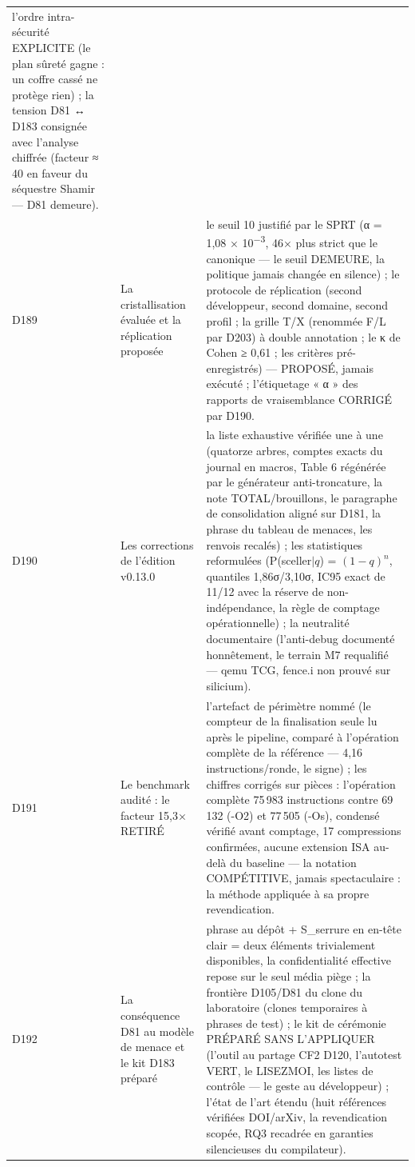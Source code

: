 \begin{longtable}{@{}p{1.6cm} p{4.6cm} >{\raggedright\arraybackslash}p{9.5cm}@{}}
l'ordre intra-sécurité EXPLICITE (le plan sûreté gagne : un coffre cassé
ne protège rien) ; la tension D81 ↔ D183 consignée avec l'analyse
chiffrée (facteur ≈ 40 en faveur du séquestre Shamir — D81 demeure). \\
D189 & La cristallisation évaluée et la réplication proposée & le seuil
10 justifié par le SPRT (α = 1,08 × 10\textsuperscript{−3}, 46× plus
strict que le canonique — le seuil DEMEURE, la politique jamais changée
en silence) ; le protocole de réplication (second développeur, second
domaine, second profil ; la grille T/X (renommée F/L par D203) à
double annotation ; le κ de
Cohen ≥ 0,61 ; les critères pré-enregistrés) — PROPOSÉ, jamais exécuté ;
l'étiquetage « α » des rapports de vraisemblance CORRIGÉ par D190. \\
D190 & Les corrections de l'édition v0.13.0 & la liste exhaustive vérifiée une à une (quatorze arbres, comptes exacts du journal en macros, Table 6 régénérée par le générateur anti-troncature, la note TOTAL/brouillons, le paragraphe de consolidation aligné sur D181, la phrase du tableau de menaces, les renvois recalés) ; les statistiques reformulées (P(sceller$|q$) = $(1-q)^n$, quantiles 1,86σ/3,10σ, IC95 exact de 11/12 avec la réserve de non-indépendance, la règle de comptage opérationnelle) ; la neutralité documentaire (l'anti-debug documenté honnêtement, le terrain M7 requalifié — qemu TCG, fence.i non prouvé sur silicium). \\
D191 & Le benchmark audité : le facteur 15,3× RETIRÉ & l'artefact de périmètre nommé (le compteur de la finalisation seule lu après le pipeline, comparé à l'opération complète de la référence — 4,16 instructions/ronde, le signe) ; les chiffres corrigés sur pièces : l'opération complète 75\,983 instructions contre 69\,132 (-O2) et 77\,505 (-Os), condensé vérifié avant comptage, 17 compressions confirmées, aucune extension ISA au-delà du baseline — la notation COMPÉTITIVE, jamais spectaculaire : la méthode appliquée à sa propre revendication. \\
D192 & La conséquence D81 au modèle de menace et le kit D183 préparé & phrase au dépôt + S\_serrure en en-tête clair = deux éléments trivialement disponibles, la confidentialité effective repose sur le seul média piège ; la frontière D105/D81 du clone du laboratoire (clones temporaires à phrases de test) ; le kit de cérémonie PRÉPARÉ SANS L'APPLIQUER (l'outil au partage CF2 D120, l'autotest VERT, le LISEZMOI, les listes de contrôle — le geste au développeur) ; l'état de l'art étendu (huit références vérifiées DOI/arXiv, la revendication scopée, RQ3 recadrée en garanties silencieuses du compilateur). \\

\end{longtable}
